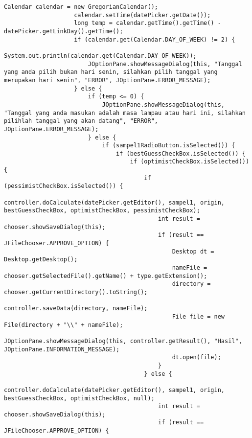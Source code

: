 \begin{lstlisting}[caption= main.java]
                    Calendar calendar = new GregorianCalendar();
                    calendar.setTime(datePicker.getDate());
                    long temp = calendar.getTime().getTime() - datePicker.getLinkDay().getTime();
                    if (calendar.get(Calendar.DAY_OF_WEEK) != 2) {
                        System.out.println(calendar.get(Calendar.DAY_OF_WEEK));
                        JOptionPane.showMessageDialog(this, "Tanggal yang anda pilih bukan hari senin, silahkan pilih tanggal yang merupakan hari senin", "ERROR", JOptionPane.ERROR_MESSAGE);
                    } else {
                        if (temp <= 0) {
                            JOptionPane.showMessageDialog(this, "Tanggal yang anda masukan adalah masa lampau atau hari ini, silahkan pilihlah tanggal yang akan datang", "ERROR", JOptionPane.ERROR_MESSAGE);
                        } else {
                            if (sampel1RadioButton.isSelected()) {
                                if (bestGuessCheckBox.isSelected()) {
                                    if (optimistCheckBox.isSelected()) {
                                        if (pessimistCheckBox.isSelected()) {
                                            controller.doCalculate(datePicker.getEditor(), sampel1, origin, bestGuessCheckBox, optimistCheckBox, pessimistCheckBox);
                                            int result = chooser.showSaveDialog(this);
                                            if (result == JFileChooser.APPROVE_OPTION) {
                                                Desktop dt = Desktop.getDesktop();
                                                nameFile = chooser.getSelectedFile().getName() + type.getExtension();
                                                directory = chooser.getCurrentDirectory().toString();
                                                controller.saveData(directory, nameFile);
                                                File file = new File(directory + "\\" + nameFile);
                                                JOptionPane.showMessageDialog(this, controller.getResult(), "Hasil", JOptionPane.INFORMATION_MESSAGE);
                                                dt.open(file);
                                            }
                                        } else {
                                            controller.doCalculate(datePicker.getEditor(), sampel1, origin, bestGuessCheckBox, optimistCheckBox, null);
                                            int result = chooser.showSaveDialog(this);
                                            if (result == JFileChooser.APPROVE_OPTION) {

\end{lstlisting}
